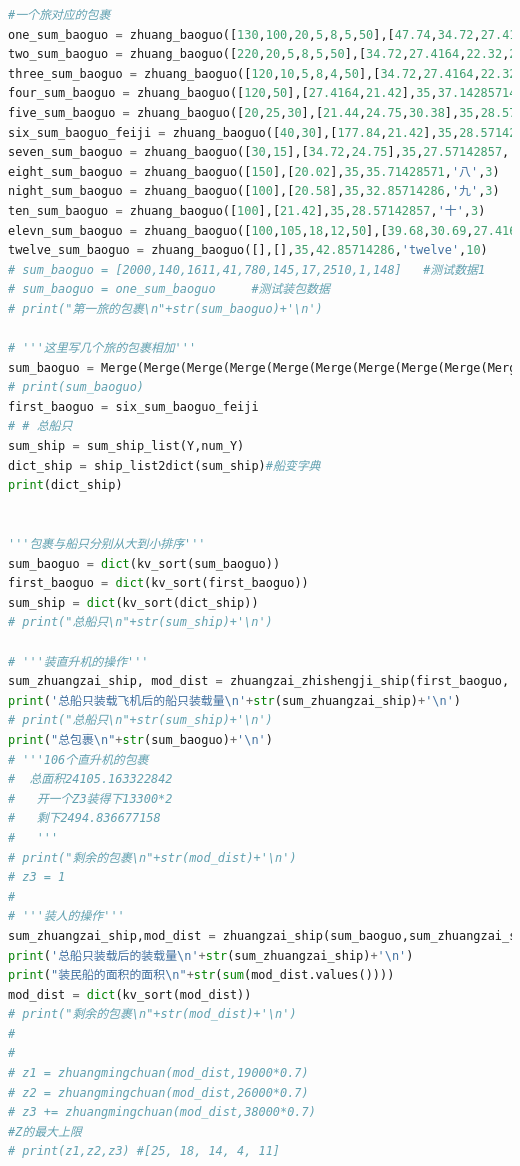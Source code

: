 \documentclass{whutmod}
\begin{document}
\begin{lstlisting}[language=python]
#一个旅对应的包裹
one_sum_baoguo = zhuang_baoguo([130,100,20,5,8,5,50],[47.74,34.72,27.4164,22.32,21.44,24.75,21.42],54,43.51851852,'一',12)
two_sum_baoguo = zhuang_baoguo([220,20,5,8,5,50],[34.72,27.4164,22.32,21.44,24.75,21.42],54,43.51851852,'二',3)
three_sum_baoguo = zhuang_baoguo([120,10,5,8,4,50],[34.72,27.4164,22.32,21.44,24.75,21.42],54,41.6666667,'三',3)
four_sum_baoguo = zhuang_baoguo([120,50],[27.4164,21.42],35,37.14285714,'四',3)
five_sum_baoguo = zhuang_baoguo([20,25,30],[21.44,24.75,30.38],35,28.5714285,'五',3)
six_sum_baoguo_feiji = zhuang_baoguo([40,30],[177.84,21.42],35,28.57142857,'六',5)#带飞机的旅，先装！！！！！！！
seven_sum_baoguo = zhuang_baoguo([30,15],[34.72,24.75],35,27.57142857,'七',5)
eight_sum_baoguo = zhuang_baoguo([150],[20.02],35,35.71428571,'八',3)
night_sum_baoguo = zhuang_baoguo([100],[20.58],35,32.85714286,'九',3)
ten_sum_baoguo = zhuang_baoguo([100],[21.42],35,28.57142857,'十',3)
elevn_sum_baoguo = zhuang_baoguo([100,105,18,12,50],[39.68,30.69,27.4164,22.32,21.42],35,71.42857143,'eleven',6)
twelve_sum_baoguo = zhuang_baoguo([],[],35,42.85714286,'twelve',10)
# sum_baoguo = [2000,140,1611,41,780,145,17,2510,1,148]   #测试数据1
# sum_baoguo = one_sum_baoguo     #测试装包数据
# print("第一旅的包裹\n"+str(sum_baoguo)+'\n')

# '''这里写几个旅的包裹相加'''
sum_baoguo = Merge(Merge(Merge(Merge(Merge(Merge(Merge(Merge(Merge(Merge(one_sum_baoguo,two_sum_baoguo),three_sum_baoguo),four_sum_baoguo),five_sum_baoguo),seven_sum_baoguo),eight_sum_baoguo),night_sum_baoguo),ten_sum_baoguo),elevn_sum_baoguo),twelve_sum_baoguo)# +.........
# print(sum_baoguo)
first_baoguo = six_sum_baoguo_feiji
# # 总船只
sum_ship = sum_ship_list(Y,num_Y)
dict_ship = ship_list2dict(sum_ship)#船变字典
print(dict_ship)


'''包裹与船只分别从大到小排序'''
sum_baoguo = dict(kv_sort(sum_baoguo))
first_baoguo = dict(kv_sort(first_baoguo))
sum_ship = dict(kv_sort(dict_ship))
# print("总船只\n"+str(sum_ship)+'\n')

# '''装直升机的操作'''
sum_zhuangzai_ship, mod_dist = zhuangzai_zhishengji_ship(first_baoguo, sum_ship)
print('总船只装载飞机后的船只装载量\n'+str(sum_zhuangzai_ship)+'\n')
# print("总船只\n"+str(sum_ship)+'\n')
print("总包裹\n"+str(sum_baoguo)+'\n')
# '''106个直升机的包裹
#  总面积24105.163322842
#   开一个Z3装得下13300*2
#   剩下2494.836677158
#   '''
# print("剩余的包裹\n"+str(mod_dist)+'\n')
# z3 = 1
#
# '''装人的操作'''
sum_zhuangzai_ship,mod_dist = zhuangzai_ship(sum_baoguo,sum_zhuangzai_ship)
print('总船只装载后的装载量\n'+str(sum_zhuangzai_ship)+'\n')
print("装民船的面积的面积\n"+str(sum(mod_dist.values())))
mod_dist = dict(kv_sort(mod_dist))
# print("剩余的包裹\n"+str(mod_dist)+'\n')
#
#
# z1 = zhuangmingchuan(mod_dist,19000*0.7)
# z2 = zhuangmingchuan(mod_dist,26000*0.7)
# z3 += zhuangmingchuan(mod_dist,38000*0.7)
#Z的最大上限
# print(z1,z2,z3) #[25, 18, 14, 4, 11]


\end{lstlisting}
\end{document}

